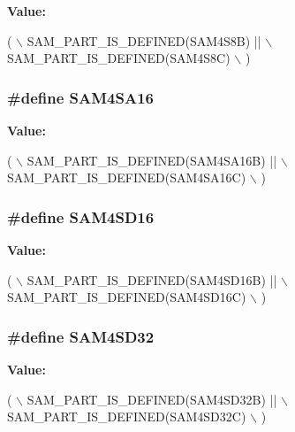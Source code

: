{\bfseries Value\-:}
\begin{DoxyCode}
( \(\backslash\)
                SAM\_PART\_IS\_DEFINED(SAM4S8B) || \(\backslash\)
                SAM\_PART\_IS\_DEFINED(SAM4S8C) \(\backslash\)
                )
\end{DoxyCode}
\hypertarget{group__sam__part__macros__group_ga51a0ff030b5d9e555653a4227538a888}{
\subsubsection[{S\-A\-M4\-S\-A16}]{\setlength{\rightskip}{0pt plus 5cm}\#define S\-A\-M4\-S\-A16}}\label{group__sam__part__macros__group_ga51a0ff030b5d9e555653a4227538a888}
{\bfseries Value\-:}
\begin{DoxyCode}
( \(\backslash\)
                SAM\_PART\_IS\_DEFINED(SAM4SA16B) || \(\backslash\)
                SAM\_PART\_IS\_DEFINED(SAM4SA16C)    \(\backslash\)
        )
\end{DoxyCode}
\hypertarget{group__sam__part__macros__group_ga817106c645da5be09dd37af37d7fb805}{
\subsubsection[{S\-A\-M4\-S\-D16}]{\setlength{\rightskip}{0pt plus 5cm}\#define S\-A\-M4\-S\-D16}}\label{group__sam__part__macros__group_ga817106c645da5be09dd37af37d7fb805}
{\bfseries Value\-:}
\begin{DoxyCode}
( \(\backslash\)
                SAM\_PART\_IS\_DEFINED(SAM4SD16B) || \(\backslash\)
                SAM\_PART\_IS\_DEFINED(SAM4SD16C)    \(\backslash\)
        )
\end{DoxyCode}
\hypertarget{group__sam__part__macros__group_gaddfc17b115c4d5b5ff8b14eb2b8d4a2a}{
\subsubsection[{S\-A\-M4\-S\-D32}]{\setlength{\rightskip}{0pt plus 5cm}\#define S\-A\-M4\-S\-D32}}\label{group__sam__part__macros__group_gaddfc17b115c4d5b5ff8b14eb2b8d4a2a}
{\bfseries Value\-:}
\begin{DoxyCode}
( \(\backslash\)
                SAM\_PART\_IS\_DEFINED(SAM4SD32B) || \(\backslash\)
                SAM\_PART\_IS\_DEFINED(SAM4SD32C)    \(\backslash\)
        )
\end{DoxyCode}
